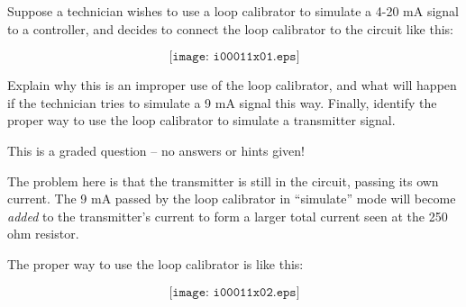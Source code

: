 

Suppose a technician wishes to use a loop calibrator to simulate a 4-20 mA signal to a controller, and decides to connect the loop calibrator to the circuit like this:

$$\texttt{[image: i00011x01.eps]}$$

Explain why this is an improper use of the loop calibrator, and what will happen if the technician tries to simulate a 9 mA signal this way.  Finally, identify the proper way to use the loop calibrator to simulate a transmitter signal.

\vfil

\eject






This is a graded question -- no answers or hints given!







The problem here is that the transmitter is still in the circuit, passing its own current.  The 9 mA passed by the loop calibrator in ``simulate'' mode will become {\it added} to the transmitter's current to form a larger total current seen at the 250 ohm resistor.

The proper way to use the loop calibrator is like this:

$$\texttt{[image: i00011x02.eps]}$$




